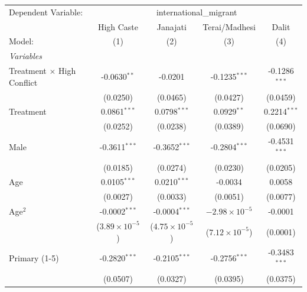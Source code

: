 
\begingroup
\centering
\begin{tabular}{lcccc}
   \tabularnewline \midrule \midrule
   Dependent Variable: & \multicolumn{4}{c}{international\_migrant}\\
                                     & High Caste              & Janajati                & Terai/Madhesi           & Dalit \\   
   Model:                            & (1)                     & (2)                     & (3)                     & (4)\\  
   \midrule
   \emph{Variables}\\
   Treatment $\times$ High Conflict  & -0.0630$^{**}$          & -0.0201                 & -0.1235$^{***}$         & -0.1286$^{***}$\\   
                                     & (0.0250)                & (0.0465)                & (0.0427)                & (0.0459)\\   
   Treatment                         & 0.0861$^{***}$          & 0.0798$^{***}$          & 0.0929$^{**}$           & 0.2214$^{***}$\\   
                                     & (0.0252)                & (0.0238)                & (0.0389)                & (0.0690)\\   
   Male                              & -0.3611$^{***}$         & -0.3652$^{***}$         & -0.2804$^{***}$         & -0.4531$^{***}$\\   
                                     & (0.0185)                & (0.0274)                & (0.0230)                & (0.0205)\\   
   Age                               & 0.0105$^{***}$          & 0.0210$^{***}$          & -0.0034                 & 0.0058\\   
                                     & (0.0027)                & (0.0033)                & (0.0051)                & (0.0077)\\   
   Age$^2$                           & -0.0002$^{***}$         & -0.0004$^{***}$         & $-2.98\times 10^{-5}$   & -0.0001\\   
                                     & ($3.89\times 10^{-5}$)  & ($4.75\times 10^{-5}$)  & ($7.12\times 10^{-5}$)  & (0.0001)\\   
   Primary (1-5)                     & -0.2820$^{***}$         & -0.2105$^{***}$         & -0.2756$^{***}$         & -0.3483$^{***}$\\   
                                     & (0.0507)                & (0.0327)                & (0.0395)                & (0.0375)\\   

\end{tabular}
